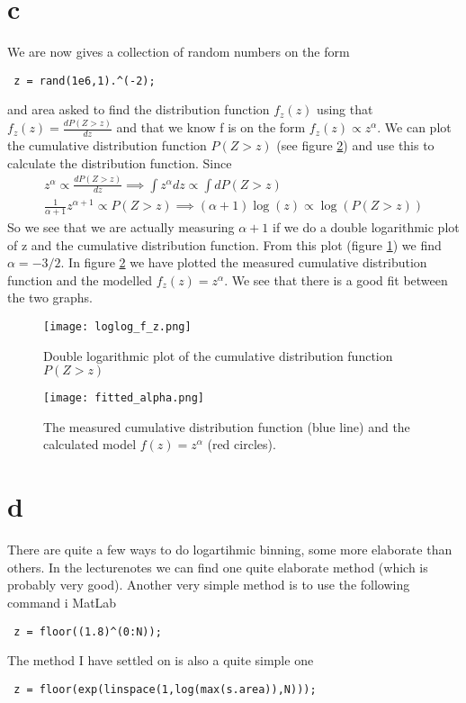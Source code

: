\documentclass[a4paper,english, 10pt, twoside]{article}
\begin{document}
\section{c}
We are now gives a collection of random numbers on the form
\begin{lstlisting}
 z = rand(1e6,1).^(-2);
\end{lstlisting}
and area asked to find the distribution function $f_z(z)$ using that $f_z(z) = \frac{dP(Z>z)}{dz}$ and that 
we know f is on the form $f_z(z)\propto z^\alpha$. We can plot the cumulative distribution function $P(Z>z)$ 
(see figure \ref{alpha}) and use this to calculate the distribution function. Since 
\begin{align*}
z^\alpha\propto\frac{dP(Z>z)}{dz} \implies \int z^\alpha dz \propto \int dP(Z>z)\\
\frac{1}{\alpha+1}z^{\alpha+1} \propto P(Z>z) \implies (\alpha +1)\log(z)\propto \log(P(Z>z))
\end{align*}
So we see that we are actually measuring $\alpha +1$ if we do a double logarithmic plot of z and the 
cumulative distribution function. From this plot (figure \ref{loglog_f_z}) we find $\alpha = -3/2$. In figure 
\ref{alpha} we have plotted the measured cumulative distribution function and the modelled $f_z(z) = z^\alpha$. 
We see that there is a good fit between the two graphs.

\begin{figure}[H]
 \centering
 \texttt{[image: loglog\_f\_z.png]}
 \caption{Double logarithmic plot of the cumulative distribution function $P(Z>z)$}
 \label{loglog_f_z}
\end{figure}

\begin{figure}[H]
 \centering
 \texttt{[image: fitted\_alpha.png]}
  \caption{The measured cumulative distribution function (blue line) and the calculated model $f(z) = z^\alpha$ (red circles).}
 \label{alpha}
\end{figure}
\section{d}
There are quite a few ways to do logartihmic binning, some more elaborate than others. In the lecturenotes 
we can find one quite elaborate method (which is probably very good). Another very simple method is to use 
the following command i MatLab
\begin{lstlisting}
 z = floor((1.8)^(0:N));
\end{lstlisting}
The method I have settled on is also a quite simple one
\begin{lstlisting}
 z = floor(exp(linspace(1,log(max(s.area)),N)));
\end{lstlisting}
\end{document}
